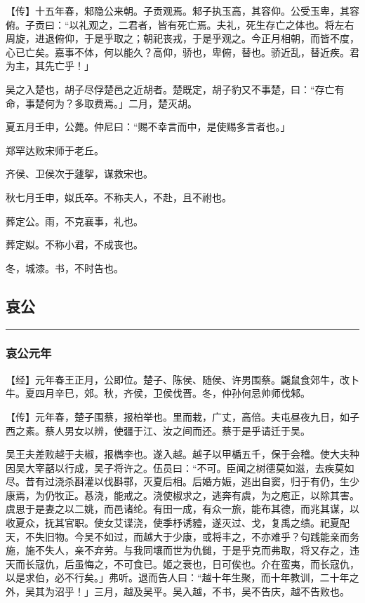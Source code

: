 \documentclass[]{article}
\begin{document}
【传】十五年春，邾隐公来朝。子贡观焉。邾子执玉高，其容仰。公受玉卑，其容俯。子贡曰：``以礼观之，二君者，皆有死亡焉。夫礼，死生存亡之体也。将左右周旋，进退俯仰，于是乎取之；朝祀丧戎，于是乎观之。今正月相朝，而皆不度，心已亡矣。嘉事不体，何以能久？高仰，骄也，卑俯，替也。骄近乱，替近疾。君为主，其先亡乎！」

吴之入楚也，胡子尽俘楚邑之近胡者。楚既定，胡子豹又不事楚，曰：``存亡有命，事楚何为？多取费焉。」二月，楚灭胡。

夏五月壬申，公薨。仲尼曰：``赐不幸言而中，是使赐多言者也。」

郑罕达败宋师于老丘。

齐侯、卫侯次于蘧挐，谋救宋也。

秋七月壬申，姒氏卒。不称夫人，不赴，且不祔也。

葬定公。雨，不克襄事，礼也。

葬定姒。不称小君，不成丧也。

冬，城漆。书，不时告也。

\hypertarget{header-n3043}{%
\subsection{哀公}\label{header-n3043}}

\begin{center}\rule{0.5\linewidth}{\linethickness}\end{center}

\hypertarget{header-n3045}{%
\subsubsection{哀公元年}\label{header-n3045}}

【经】元年春王正月，公即位。楚子、陈侯、随侯、许男围蔡。鼷鼠食郊牛，改卜牛。夏四月辛巳，郊。秋，齐侯，卫侯伐晋。冬，仲孙何忌帅师伐邾。

【传】元年春，楚子围蔡，报柏举也。里而栽，广丈，高倍。夫屯昼夜九日，如子西之素。蔡人男女以辨，使疆于江、汝之间而还。蔡于是乎请迁于吴。

吴王夫差败越于夫椒，报檇李也。遂入越。越子以甲楯五千，保于会稽。使大夫种因吴大宰嚭以行成，吴子将许之。伍员曰：``不可。臣闻之树德莫如滋，去疾莫如尽。昔有过浇杀斟灌以伐斟鄩，灭夏后相。后婚方娠，逃出自窦，归于有仍，生少康焉，为仍牧正。惎浇，能戒之。浇使椒求之，逃奔有虞，为之庖正，以除其害。虞思于是妻之以二姚，而邑诸纶。有田一成，有众一旅，能布其德，而兆其谋，以收夏众，抚其官职。使女艾谍浇，使季杼诱豷，遂灭过、戈，复禹之绩。祀夏配天，不失旧物。今吴不如过，而越大于少康，或将丰之，不亦难乎？句践能亲而务施，施不失人，亲不弃劳。与我同壤而世为仇雠，于是乎克而弗取，将又存之，违天而长寇仇，后虽悔之，不可食已。姬之衰也，日可俟也。介在蛮夷，而长寇仇，以是求伯，必不行矣。」弗听。退而告人曰：``越十年生聚，而十年教训，二十年之外，吴其为沼乎！」三月，越及吴平。吴入越，不书，吴不告庆，越不告败也。
\end{document}
